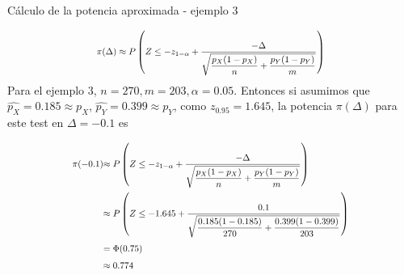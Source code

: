\documentclass{beamer}
\theoremstyle{definition}
\newcommand\scalemath[2]{\scalebox{#1}{\mbox{\ensuremath{\displaystyle #2}}}}
\begin{document}
\begin{frame}{\color{rosee}C\'alculo de la potencia aproximada - ejemplo 3}
\small


    
$$\scalemath{0.8}{
\pi(\Delta) \approx P\left(Z \leq -z_{1- \alpha}+\frac{-\Delta}{\sqrt{\dfrac{p_X(1-p_X)}{n}+\dfrac{p_Y(1-p_Y)}{m}}}\right)}
$$
Para el ejemplo $3$, $n=270, m=203, \alpha=0.05$.
Entonces si asumimos que $\widehat{p_X}=0.185\approx p_X$, $\widehat{p_Y}=0.399\approx p_Y$, como $z_{0.95}=1.645$, la potencia $\pi(\Delta)$ para este test en $\Delta=-0.1$ es



$$
\begin{aligned}\scalemath{0.8}{
\pi(-0.1)} & \scalemath{0.8}{\approx P\left(Z \leq -z_{1- \alpha}+\frac{-\Delta}{\sqrt{\dfrac{p_X(1-p_X)}{n}+\dfrac{p_Y(1-p_Y)}{m}}}\right)} \\
& \scalemath{0.8}{\approx P\left(Z\leq -1.645+\frac{0.1}{\sqrt{\dfrac{0.185(1-0.185)}{270}+\dfrac{0.399(1-0.399)}{203}}}\right)} \\
&\scalemath{0.8}{=\Phi(0.75)} \\
&\scalemath{0.8}{\approx 0.774}
\end{aligned}
$$
\end{frame}
\end{document}
